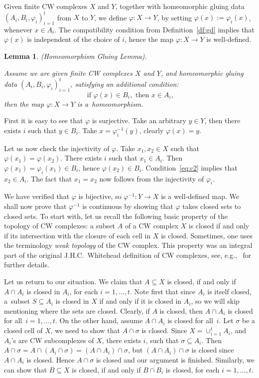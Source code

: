 \documentclass{amsart}[10pt]
\newtheorem{lm}[theorem]{Lemma}
\newcommand{\pr}{\nin{\bf Proof.} }
\numberwithin{equation}{section}
\numberwithin{figure}{section}
\numberwithin{table}{section}
\begin{document}
Given finite CW complexes $X$ and $Y$, together with homeomorphic
gluing data $(A_i,B_i,\varphi_i)_{i=1}^t$ from $X$ to $Y$, we define
$\varphi:X\rightarrow Y$, by setting $\varphi(x):=\varphi_i(x)$,
whenever $x\in A_i$. The compatibility condition from
Definition~\ref{df:gd} implies that $\varphi(x)$ is independent of the
choice of $i$, hence the map $\varphi:X\rightarrow Y$ is well-defined.

\begin{lm} \label{lm:hg} {\rm (Homeomorphism Gluing Lemma).}

\noindent Assume we are given finite CW complexes $X$ and $Y$, and
homeomorphic gluing data $(A_i,B_i,\varphi_i)_{i=1}^t$, satisfying an
additional condition:
\begin{equation} \label{eq:c2}
\textrm{ if } \varphi(x)\in B_i, \textrm{ then } x\in A_i,
\end{equation}
then the map $\varphi:X\rightarrow Y$ is a~homeomorphism.
\end{lm}
\pr First it is easy to see that $\varphi$ is surjective. 
Take an arbitrary $y\in Y$, then there exists $i$ such that $y\in B_i$.
Take $x=\varphi_i^{-1}(y)$, clearly $\varphi(x)=y$.

Let us now check the injectivity of $\varphi$. Take $x_1,x_2\in X$
such that $\varphi(x_1)=\varphi(x_2)$. There exists $i$ such that
$x_1\in A_i$.  Then $\varphi(x_1)=\varphi_i(x_1)\in B_i$, hence
$\varphi(x_2)\in B_i$.  Condition~\eqref{eq:c2} implies that $x_2\in
A_i$. The fact that $x_1=x_2$ now follows from the injectivity of
$\varphi_i$.

We have verified that $\varphi$ is bijective, so
$\varphi^{-1}:Y\rightarrow X$ is a well-defined map. We shall now
prove that $\varphi^{-1}$ is continuous by showing that $\varphi$
takes closed sets to closed sets. To start with, let us recall the
following basic property of the topology of CW complexes: a subset $A$
of a CW complex $X$ is closed if and only if its intersection with the
closure of each cell in $X$ is closed. Sometimes, one uses the
terminology {\it weak topology} of the CW complex. This property was
an integral part of the original J.H.C.\ Whitehead definition of CW
complexes, see, e.g.,~\cite[Proposition A.2.]{Hat} for further
details.

Let us return to our situation. We claim that $A\subseteq X$ is
closed, if and only if $A\cap A_i$ is closed in $A_i$, for each
$i=1,\dots,t$. Note first that since $A_i$ is itself closed, a~subset
$S\subseteq A_i$ is closed in $X$ if and only if it is closed in
$A_i$, so we will skip mentioning where the sets are closed.  Clearly,
if $A$ is closed, then $A\cap A_i$ is closed for all~$i=1,\dots,t$.
On the other hand, assume $A\cap A_i$ is closed for all~$i$. Let
$\sigma$ be a closed cell of $X$, we need to show that $A\cap\sigma$
is closed.  Since $X=\cup_{i=1}^t A_i$, and $A_i$'s are CW
subcomplexes of $X$, there exists $i$, such that $\sigma\subseteq
A_i$. Then $A\cap\sigma=A\cap (A_i\cap\sigma)=(A\cap A_i)\cap\sigma$,
but $(A\cap A_i)\cap\sigma$ is closed since $A\cap A_i$ is closed.
Hence $A\cap\sigma$ is closed and our argument is finished.
Similarly, we can show that $B\subseteq X$ is closed, if and only if
$B\cap B_i$ is closed, for each $i=1,\dots,t$.
 
\end{document}
